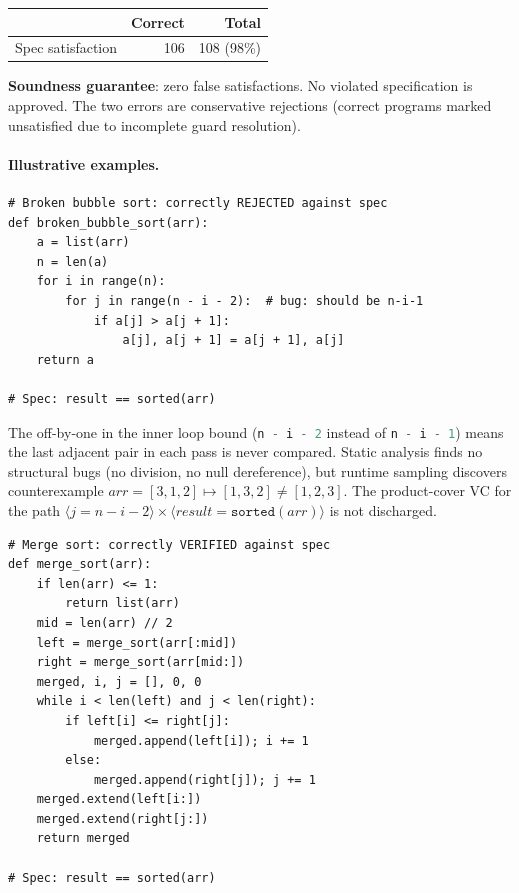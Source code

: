 \documentclass[acmsmall,screen]{acmart}
\theoremstyle{remark}
\newcommand{\py}[1]{\lstinline[language=Python]{#1}}
\begin{document}
\begin{center}\small
\begin{tabular}{lrr}
\toprule
& \textbf{Correct} & \textbf{Total} \\
\midrule
Spec satisfaction & 106 & 108 (98\%) \\
\bottomrule
\end{tabular}
\end{center}

\noindent \textbf{Soundness guarantee}: zero false satisfactions.
No violated specification is approved.  The two errors are conservative
rejections (correct programs marked unsatisfied due to incomplete
guard resolution).

\paragraph{Illustrative examples.}

\begin{lstlisting}
# Broken bubble sort: correctly REJECTED against spec
def broken_bubble_sort(arr):
    a = list(arr)
    n = len(a)
    for i in range(n):
        for j in range(n - i - 2):  # bug: should be n-i-1
            if a[j] > a[j + 1]:
                a[j], a[j + 1] = a[j + 1], a[j]
    return a

# Spec: result == sorted(arr)
\end{lstlisting}

\noindent The off-by-one in the inner loop bound (\py{n - i - 2}
instead of \py{n - i - 1}) means the last adjacent pair in each pass
is never compared.  Static analysis finds no structural bugs (no
division, no null dereference), but runtime sampling discovers
counterexample $\textit{arr} = [3, 1, 2] \mapsto [1, 3, 2] \neq
[1, 2, 3]$.  The product-cover VC for the path
$\langle j = n{-}i{-}2 \rangle \times \langle \textit{result} =
\texttt{sorted}(\textit{arr}) \rangle$ is not discharged.

\begin{lstlisting}
# Merge sort: correctly VERIFIED against spec
def merge_sort(arr):
    if len(arr) <= 1:
        return list(arr)
    mid = len(arr) // 2
    left = merge_sort(arr[:mid])
    right = merge_sort(arr[mid:])
    merged, i, j = [], 0, 0
    while i < len(left) and j < len(right):
        if left[i] <= right[j]:
            merged.append(left[i]); i += 1
        else:
            merged.append(right[j]); j += 1
    merged.extend(left[i:])
    merged.extend(right[j:])
    return merged

# Spec: result == sorted(arr)
\end{lstlisting}
\end{document}
